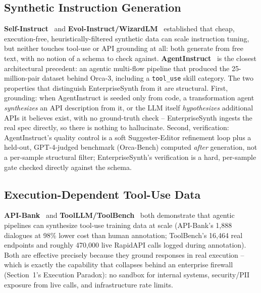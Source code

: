 \documentclass[11pt]{article}
\begin{document}
\subsection{Synthetic Instruction Generation}
\textbf{Self-Instruct}~\cite{wang2022selfinstruct} and \textbf{Evol-Instruct/WizardLM}~\cite{xu2023wizardlm}
established that cheap, execution-free, heuristically-filtered synthetic data can scale instruction
tuning, but neither touches tool-use or API grounding at all: both generate from free text, with no
notion of a schema to check against. \textbf{AgentInstruct}~\cite{mitra2024agentinstruct} is the
closest architectural precedent: an agentic multi-flow pipeline that produced the 25-million-pair
dataset behind Orca-3, including a \texttt{tool\_use} skill category. The two properties that
distinguish EnterpriseSynth from it are structural. First, grounding: when AgentInstruct is seeded
only from code, a transformation agent \textit{synthesizes} an API description from it, or the LLM
itself \textit{hypothesizes} additional APIs it believes exist, with no ground-truth check --
EnterpriseSynth ingests the real spec directly, so there is nothing to hallucinate. Second,
verification: AgentInstruct's quality control is a soft Suggester-Editor refinement loop plus a
held-out, GPT-4-judged benchmark (Orca-Bench) computed \textit{after} generation, not a per-sample
structural filter; EnterpriseSynth's verification is a hard, per-sample gate checked directly
against the schema.

\subsection{Execution-Dependent Tool-Use Data}
\textbf{API-Bank}~\cite{li2023apibank} and \textbf{ToolLLM/ToolBench}~\cite{qin2023toolbench} both
demonstrate that agentic pipelines can synthesize tool-use training data at scale (API-Bank's
1,888 dialogues at 98\% lower cost than human annotation; ToolBench's 16,464 real endpoints and
roughly 470,000 live RapidAPI calls logged during annotation). Both are effective precisely
because they ground responses in real execution -- which is exactly the capability that collapses
behind an enterprise firewall (Section~1's Execution Paradox): no sandbox for internal systems,
security/PII exposure from live calls, and infrastructure rate limits.
\end{document}
